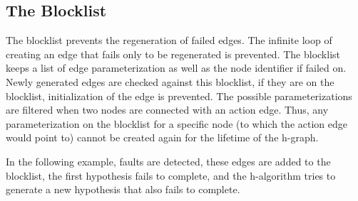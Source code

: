 \subsection{The Blocklist}%
The blocklist prevents the regeneration of failed edges. The infinite loop of creating an edge that fails only to be regenerated is prevented. The blocklist keeps a list of edge parameterization as well as the node identifier if failed on. Newly generated edges are checked against this blocklist, if they are on the blocklist, initialization of the edge is prevented. The possible parameterizations are filtered when two nodes are connected with an action edge. Thus, any parameterization on the blocklist for a specific node (to which the action edge would point to) cannot be created again for the lifetime of the \ac{h-graph}.\bs

In the following example,  faults are detected, these edges are added to the blocklist, the first hypothesis fails to complete, and the \ac{h-algorithm} tries to generate a new hypothesis that also fails to complete.\bs

